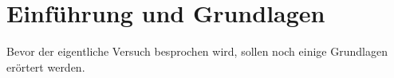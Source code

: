 \section{Einführung und Grundlagen}
Bevor der eigentliche Versuch besprochen wird, sollen noch einige Grundlagen erörtert werden.
